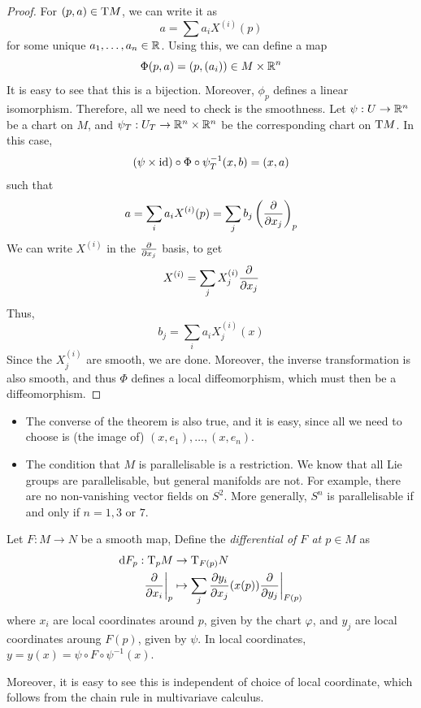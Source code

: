 \documentclass{article}
\begin{document}
\begin{proof}
    For \((p, a) \in \mathrm{T} M\), we can write it as
    \[a = \sum a_i X^{(i)}(p)\]
    for some unique \(a_1, \dots, a_n \in \mathbb{R}\). Using this, we can define a map
    \[\Phi(p, a) = (p,  (a_i)) \in M \times \mathbb{R}^n\]
    It is easy to see that this is a bijection. Moreover, \(\phi_p\) defines a linear isomorphism. Therefore, all we need to check is the smoothness. Let \(\psi : U \to \mathbb{R}^n\) be a chart on \(M\), and \(\psi_T : U_T \to \mathbb{R}^n \times \mathbb{R}^n\) be the corresponding chart on \(\mathrm{T} M\). In this case,
    \[(\psi \times \operatorname{id}) \circ \Phi \circ \psi_T^{-1}(x, b) = (x, a)\]
    such that
    \[a = \sum_i a_i X^{(i)}(p) = \sum_j b_j \left(\pdv{x_j}\right)_p\]
    We can write \(X^{(i)}\) in the \(\pdv{x_j}\) basis, to get
    \[X^{(i)} = \sum_j X^{(i)}_j \pdv{x_j}\]
    Thus,
    \[b_j = \sum_i a_i X^{(i)}_j(x)\]
    Since the \(X^{(i)}_j\) are smooth, we are done. Moreover, the inverse transformation is also smooth, and thus \(\Phi\) defines a local diffeomorphism, which must then be a diffeomorphism.
\end{proof}

\begin{remark}
    \begin{itemize}
        \item The converse of the theorem is also true, and it is easy, since all we need to choose is (the image of) \((x, e_1), \dots, (x, e_n)\).
        \item The condition that \(M\) is parallelisable is a restriction. We know that all Lie groups are parallelisable, but general manifolds are not. For example, there are no non-vanishing vector fields on \(S^2\). More generally, \(S^n\) is parallelisable if and only if \(n = 1, 3\) or \(7\).
    \end{itemize}
\end{remark}

\begin{definition}
    [differential]
    Let \(F : M \to N\) be a smooth map, Define the \emph{differential of \(F\) at \(p \in M\)} as
    \begin{align*}
        \dd F_p : \mathrm{T}_p M &\to \mathrm{T}_{F(p)} N \\
        \pdv{x_i}\bigg\vert_p &\mapsto \sum_j {\pdv{y_i}{x_j}}(x(p))\pdv{y_j}\bigg\vert_{F(p)}
    \end{align*}
    where \(x_i\) are local coordinates around \(p\), given by the chart \(\varphi\), and \(y_j\) are local coordinates aroung \(F(p)\), given by \(\psi\). In local coordinates, \(y = y(x) = \psi \circ F \circ \psi^{-1}(x)\).

    Moreover, it is easy to see this is independent of choice of local coordinate, which follows from the chain rule in multivariave calculus.
\end{definition}
\end{document}
